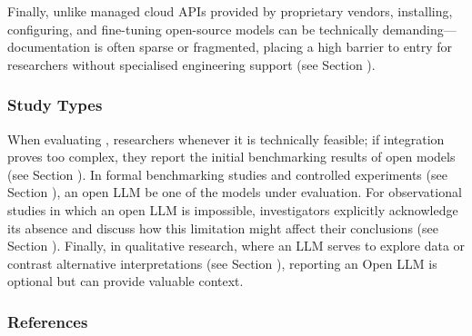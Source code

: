 Finally, unlike managed cloud APIs provided by proprietary vendors, installing, configuring, and fine-tuning open-source models can be technically demanding---documentation is often sparse or fragmented, placing a high barrier to entry for researchers without specialised engineering support (see Section \limitationsmitigations).

\subsubsection{Study Types}

When evaluating \newtools, researchers \should \openllm whenever it is technically feasible; if integration proves too complex, they \must report the initial benchmarking results of open models (see Section \benchmarksmetrics). In formal benchmarking studies and controlled experiments (see Section \benchmarkingtasks), an open LLM \must be one of the models under evaluation. For observational studies in which an open LLM is impossible, investigators \should explicitly acknowledge its absence and discuss how this limitation might affect their conclusions (see Section \limitationsmitigations). Finally, in qualitative research, where an LLM serves to explore data or contrast alternative interpretations (see Section \synthesis), reporting an Open LLM is optional but can provide valuable context.


\subsubsection{References}





